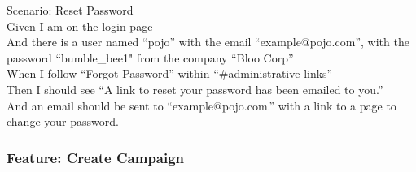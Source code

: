 \documentclass[12pt]{article}
\begin{document}
\begin{hangparas}{0.25in}{1}
Scenario: Reset Password \\
  Given I am on the login page \\
  And there is a user named ``pojo'' with the email ``example@pojo.com'', with the password ``bumble\_bee1" from the company ``Bloo Corp'' \\
  When I follow ``Forgot Password'' within ``\#administrative-links'' \\
  Then I should see ``A link to reset your password has been emailed to you.'' \\
  And an email should be sent to ``example@pojo.com.'' with a link to a page to change your password. \\
\end{hangparas}

\subsubsection{Feature: Create Campaign}
\end{document}
